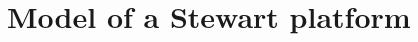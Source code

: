 \documentclass[]{interact}
\theoremstyle{plain}%
\theoremstyle{definition}
\theoremstyle{remark}
\begin{document}
{\section{Model of a Stewart platform}
\label{Sec:Stewart_platform_model}

\begin{figure}
\centering
{}\hspace{5pt}
\subfloat[Kinematics.]{%
}
\end{figure}}
\end{document}
